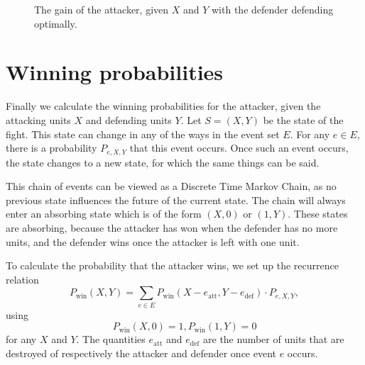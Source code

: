 \documentclass{amsart}
\begin{document}
	\begin{figure}
	
	
	\caption{The gain of the attacker, given $X$ and $Y$ with the defender defending optimally.} \label{fig:3}
	\end{figure}
	
	\section{Winning probabilities}
	
	Finally we calculate the winning probabilities for the attacker, given the attacking units $X$ and defending units $Y$. Let $S = (X, Y)$ be the state of the fight. This state can change in any of the ways in the event set $E$. For any $e \in E$, there is a probability $P_{e,X,Y}$ that this event occurs. Once such an event occurs, the state changes to a new state, for which the same things can be said.
	
	This chain of events can be viewed as a Discrete Time Markov Chain, as no previous state influences the future of the current state. The chain will always enter an absorbing state which is of the form $(X, 0)$ or $(1, Y)$. These states are absorbing, because the attacker has won when the defender has no more units, and the defender wins once the attacker is left with one unit.
	
	To calculate the probability that the attacker wins, we set up the recurrence relation
	$$
	P_\text{win}(X, Y) = \sum_{e \in E} P_\text{win}(X - e_\text{att}, Y-e_\text{def}) \cdot P_{e, X, Y}, 
	$$
	using 
	$$
	P_\text{win}(X,0) = 1, P_\text{win}(1, Y) = 0
	$$
	for any $X$ and $Y$. The quantities $e_\text{att}$ and $e_\text{def}$ are the number of units that are destroyed of respectively the attacker and defender once event $e$ occurs.
	
\end{document}
